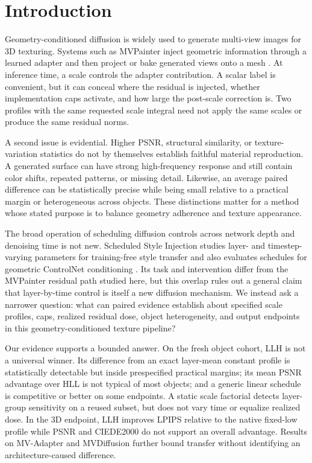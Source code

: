 \documentclass[times,twocolumn,final]{elsarticle}
\begin{document}
\section{Introduction}
\label{sec:intro}

Geometry-conditioned diffusion is widely used to generate multi-view images for 3D texturing. Systems such as MVPainter inject geometric information through a learned adapter and then project or bake generated views onto a mesh \cite{shao2025mvpainter}. At inference time, a scale controls the adapter contribution. A scalar label is convenient, but it can conceal where the residual is injected, whether implementation caps activate, and how large the post-scale correction is. Two profiles with the same requested scale integral need not apply the same scales or produce the same residual norms.

A second issue is evidential. Higher PSNR, structural similarity, or texture-variation statistics do not by themselves establish faithful material reproduction. A generated surface can have strong high-frequency response and still contain color shifts, repeated patterns, or missing detail. Likewise, an average paired difference can be statistically precise while being small relative to a practical margin or heterogeneous across objects. These distinctions matter for a method whose stated purpose is to balance geometry adherence and texture appearance.

The broad operation of scheduling diffusion controls across network depth and denoising time is not new. Scheduled Style Injection studies layer- and timestep-varying parameters for training-free style transfer and also evaluates schedules for geometric ControlNet conditioning \cite{kulkarni2026scheduled}. Its task and intervention differ from the MVPainter residual path studied here, but this overlap rules out a general claim that layer-by-time control is itself a new diffusion mechanism. We instead ask a narrower question: what can paired evidence establish about specified scale profiles, caps, realized residual dose, object heterogeneity, and output endpoints in this geometry-conditioned texture pipeline?

Our evidence supports a bounded answer. On the fresh object cohort, LLH is not a universal winner. Its difference from an exact layer-mean constant profile is statistically detectable but inside prespecified practical margins; its mean PSNR advantage over HLL is not typical of most objects; and a generic linear schedule is competitive or better on some endpoints. A static scale factorial detects layer-group sensitivity on a reused subset, but does not vary time or equalize realized dose. In the 3D endpoint, LLH improves LPIPS relative to the native fixed-low profile while PSNR and CIEDE2000 do not support an overall advantage. Results on MV-Adapter and MVDiffusion further bound transfer without identifying an architecture-caused difference.
\end{document}
